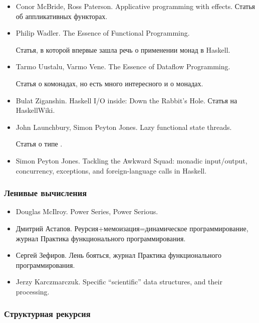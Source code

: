 \begin{itemize}
\item Conor McBride, Ross Paterson. Applicative programming with effects.
    Статья об аппликативных функторах.

\item Philip Wadler. The Essence of Functional Programming.
     
    Статья, в которой впервые зашла речь о применении монад
        в Haskell.

\item Tarmo Uustalu, Varmo Vene. The Essence of Dataflow Programming.
    
    Статья о комонадах, но есть много интересного и о монадах.

\item Bulat Ziganshin. Haskell I/O inside: Down the Rabbit's Hole. 
    Статья на HaskellWiki.

\item John Launchbury, Simon Peyton Jones. Lazy functional state threads.

    Статья о типе .

\item Simon Peyton Jones. Tackling the Awkward Squad:
    monadic input/output, concurrency, exceptions, and
    foreign-language calls in Haskell.
\end{itemize}

\subsubsection{Ленивые вычисления}

\begin{itemize}
\item Douglas McIlroy. Power Series, Power Serious.

\item Дмитрий Астапов. Реурсия+мемоизация=динамическое программирование,
    журнал Практика функционального программирования.

\item Сергей Зефиров. Лень бояться, журнал Практика функционального
    программирования.

\item Jerzy Karczmarczuk. Specific “scientific” data structures, 
    and their processing.

\end{itemize}

\subsubsection{Структурная рекурсия}

